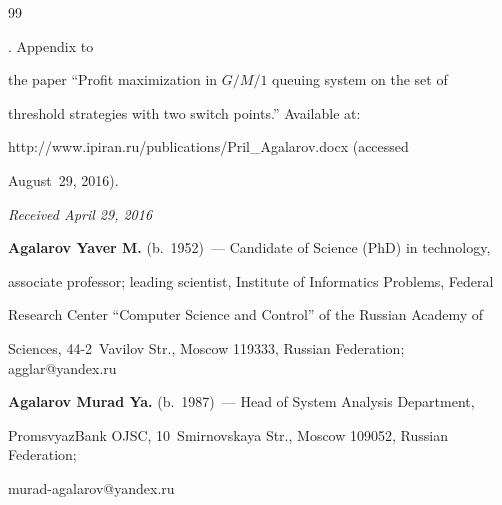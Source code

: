 {{\begin{thebibliography}{99}


. Appendix to 


the paper ``Profit maximization in $G/M/1$ queuing system on the set of 


threshold strategies with two switch points.'' Available at: 


{\sf http://www.ipiran.ru/publications/Pril\_Agalarov.docx} (accessed  


August~29, 2016).


\end{thebibliography}


} }








\vspace*{-3pt}





\hfill{\small\textit{Received April 29, 2016}}





\Contr





\noindent


\textbf{Agalarov Yaver M.} (b.\ 1952)~--- Candidate of Science (PhD) in technology, 


associate professor; leading scientist, Institute of Informatics Problems, Federal 


Research Center ``Computer Science and Control'' of the Russian Academy of 


Sciences, 44-2~Vavilov Str., Moscow 119333, Russian Federation; \mbox{agglar@yandex.ru}





\vspace*{3pt}


  


  \noindent


\textbf{Agalarov Murad Ya.} (b.\ 1987)~--- Head of System Analysis Department, 


PromsvyazBank OJSC, 10~Smirnovskaya Str., Moscow 109052, Russian Federation;


\mbox{murad-agalarov@yandex.ru}





